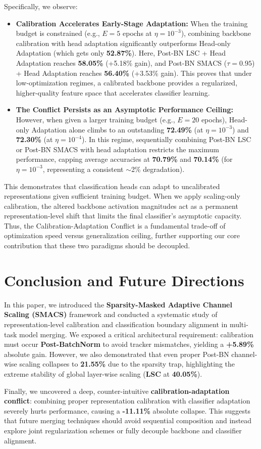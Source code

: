 \documentclass{article}
\theoremstyle{plain}
\theoremstyle{definition}
\theoremstyle{remark}
\begin{document}
Specifically, we observe:
\begin{itemize}
    \item \textbf{Calibration Accelerates Early-Stage Adaptation:} When the training budget is constrained (e.g., $E=5$ epochs at $\eta=10^{-3}$), combining backbone calibration with head adaptation significantly outperforms Head-only Adaptation (which gets only \textbf{52.87\%}). Here, Post-BN LSC + Head Adaptation reaches \textbf{58.05\%} (+5.18\% gain), and Post-BN SMACS ($\tau=0.95$) + Head Adaptation reaches \textbf{56.40\%} (+3.53\% gain). This proves that under low-optimization regimes, a calibrated backbone provides a regularized, higher-quality feature space that accelerates classifier learning.
    \item \textbf{The Conflict Persists as an Asymptotic Performance Ceiling:} However, when given a larger training budget (e.g., $E=20$ epochs), Head-only Adaptation alone climbs to an outstanding \textbf{72.49\%} (at $\eta=10^{-3}$) and \textbf{72.30\%} (at $\eta=10^{-4}$). In this regime, sequentially combining Post-BN LSC or Post-BN SMACS with head adaptation restricts the maximum performance, capping average accuracies at \textbf{70.79\%} and \textbf{70.14\%} (for $\eta=10^{-3}$, representing a consistent $\sim$2\% degradation).
\end{itemize}
This demonstrates that classification heads can adapt to uncalibrated representations given sufficient training budget. When we apply scaling-only calibration, the altered backbone activation magnitudes act as a permanent representation-level shift that limits the final classifier's asymptotic capacity. Thus, the Calibration-Adaptation Conflict is a fundamental trade-off of optimization speed versus generalization ceiling, further supporting our core contribution that these two paradigms should be decoupled.

\section{Conclusion and Future Directions}
\label{sec:conclusion}

In this paper, we introduced the \textbf{Sparsity-Masked Adaptive Channel Scaling (SMACS)} framework and conducted a systematic study of representation-level calibration and classification boundary alignment in multi-task model merging. We exposed a critical architectural requirement: calibration must occur \textbf{Post-BatchNorm} to avoid tracker mismatches, yielding a \textbf{+5.89\%} absolute gain. However, we also demonstrated that even proper Post-BN channel-wise scaling collapses to \textbf{21.55\%} due to the sparsity trap, highlighting the extreme stability of global layer-wise scaling (\textbf{LSC} at \textbf{40.05\%}). 

Finally, we uncovered a deep, counter-intuitive \textbf{calibration-adaptation conflict}: combining proper representation calibration with classifier adaptation severely hurts performance, causing a \textbf{-11.11\%} absolute collapse. This suggests that future merging techniques should avoid sequential composition and instead explore joint regularization schemes or fully decouple backbone and classifier alignment.



\end{document}
